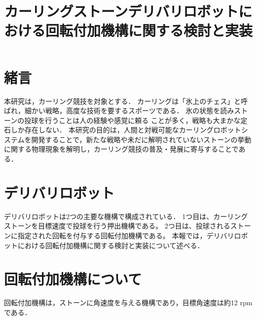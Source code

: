 \documentclass{classes/sice-si}
\title{カーリングストーンデリバリロボットにおける回転付加機構に関する検討と実装} %
\begin{document}


\maketitle

\section{緒言}
本研究は，カーリング競技を対象とする．
カーリングは「氷上のチェス」と呼ばれ，細かい戦略，高度な技術を要するスポーツである．
氷の状態を読みストーンの投球を行うことは人の経験や感覚に頼る
ことが多く，戦略も大まかな定石しか存在しない．
本研究の目的は，人間と対戦可能なカーリングロボットシステムを開発することで，新たな戦略や未だに解明されていないストーンの挙動に関する物理現象を解明し，カーリング競技の普及・発展に寄与することである．

\section{デリバリロボット}
デリバリロボットは2つの主要な機構で構成されている．
1つ目は、カーリングストーンを目標速度で投球を行う押出機構である。
2つ目は、投球されるストーンに指定された回転を付与する回転付加機構である。
本報では，デリバリロボットにおける回転付加機構に関する検討と実装について述べる．
\section{回転付加機構について}
回転付加機構は，ストーンに角速度を与える機構であり，目標角速度は約12 rpmである．
\end{document}
